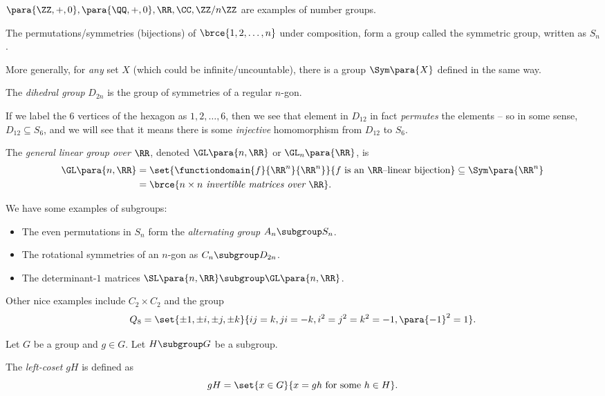 \begin{examples}
    \label{ex:examples-of-groups}%
    \(\para{\ZZ, +, 0}, \para{\QQ, +, 0}, \RR, \CC, \ZZ/n\ZZ\) are examples of number groups.

    The permutations/symmetries (bijections) of \(\brce{1, 2, \ldots, n}\) under composition, form a group called the symmetric group, written as \(S_n\).
    
    More generally, for \emph{any} set \(X\) (which could be infinite/uncountable), there is a group \(\Sym\para{X}\) defined in the same way.

    The \emph{dihedral group} \(D_{2n}\) is the group of symmetries of a regular \(n\)-gon.

    If we label the \(6\) vertices of the hexagon as \(1, 2, \ldots, 6\), then we see that element in \(D_{12}\) in fact \emph{permutes} the elements -- so in some sense, \(D_{12} \subseteq S_6\), and we will see that it means there is some \emph{injective} homomorphism from \(D_{12}\) to \(S_6\).

    The \emph{general linear group over \(\RR\)}, denoted \(\GL\para{n, \RR}\) or \(\GL_n\para{\RR}\), is
    \begin{align*}
        \GL\para{n, \RR} &= \set{\functiondomain{f}{\RR^n}{\RR^n}}{f \text{ is an }\RR\text{--linear bijection}} \subseteq \Sym\para{\RR^n} \\
        &= \brce{n \times n \emph{ invertible matrices over }\RR}.
    \end{align*}

    We have some examples of subgroups:
    \begin{itemize}
        \item The even permutations in \(S_n\) form the \emph{alternating group} \(A_n \subgroup S_n\).
        \item The rotational symmetries of an \(n\)-gon as \(C_n \subgroup D_{2n}\).
        \item The determinant-\(1\) matrices \(\SL\para{n, \RR} \subgroup \GL\para{n, \RR}\).
    \end{itemize}

    Other nice examples include \(C_2 \times C_2\) and the group
    \[
        Q_8 = \set{\pm 1, \pm i, \pm j, \pm k}{ij = k, ji = -k, i^2 = j^2 = k^2 = -1, \para{-1}^2 = 1}.
    \]
\end{examples}

\begin{definition}[Coset]
    \label{def:coset}%
    Let \(G\) be a group and  \(g \in G\). Let \(H \subgroup G\) be a subgroup.
    
    The \emph{left-coset} \(gH\) is defined as
    \[
        gH = \set{x \in G}{x = gh \text{ for some } h \in H}.
    \]
\end{definition}

